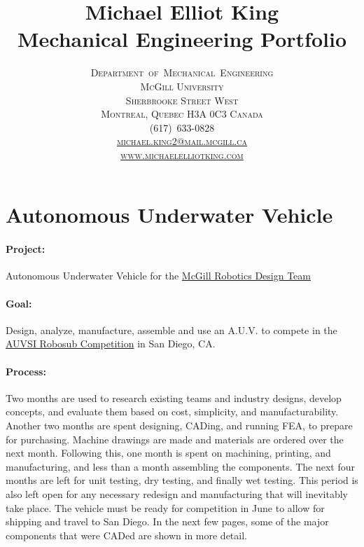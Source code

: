 \documentclass[12pt, landscape]{article}
\title{\Huge Michael Elliot King\\[10pt]
Mechanical Engineering Portfolio}
\author{\scshape Department~of~Mechanical~Engineering\\
\scshape McGill University\\
\normalfont 817 Sherbrooke Street West\\
Montreal, Quebec H3A 0C3 Canada\\[20pt]
(617)~633-0828\\
\href{mailto:michael.king2@mail.mcgill.ca}{michael.king2@mail.mcgill.ca}\\
\href{http://www.michaelelliotking.com}{www.michaelelliotking.com}
}
\date{}
\begin{document}
\begin{titlepage}
\linespread{1}\maketitle
\thispagestyle{empty}
\end{titlepage}


\pagestyle{fancy}

\section{Autonomous Underwater Vehicle}
\paragraph{Project:} Autonomous Underwater Vehicle for the \href{http://www.mcgillrobotics.com}{McGill Robotics Design Team}
\paragraph{Goal:} Design, analyze, manufacture, assemble and use an A.U.V. to compete in the \href{http://www.robosub.org}{AUVSI Robosub Competition} in San Diego, CA.
\paragraph{Process:} Two months are used to research existing teams and industry designs, develop concepts, and evaluate them based on cost, simplicity, and manufacturability.  Another two months are spent designing, CADing, and running FEA, to prepare for purchasing.  Machine drawings are made and materials are ordered over the next month.  Following this, one month is spent on machining, printing, and manufacturing, and less than a month assembling the components.  The next four months are left for unit testing, dry testing, and finally wet testing.  This period is also left open for any necessary redesign and manufacturing that will inevitably take place.  The vehicle must be ready for competition in June to allow for shipping and travel to San Diego.
In the next few pages, some of the major components that were CADed are shown in more detail.
\end{document}

